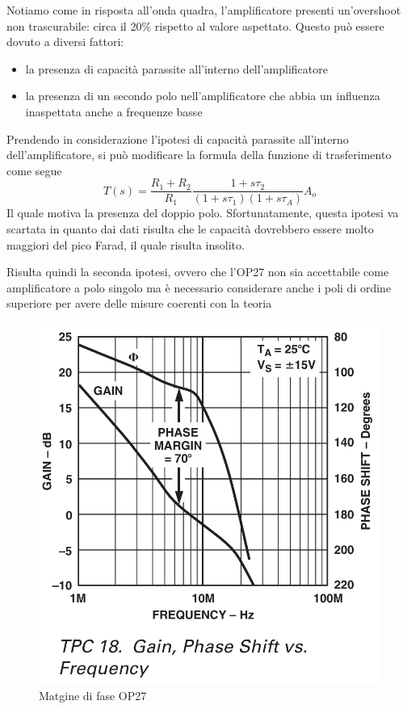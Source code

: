 

\begin{flushleft}

\colorbox{notebox}{
\begin{minipage}[]{\textwidth}

    Notiamo come in risposta all'onda quadra, l'amplificatore presenti un'overshoot non trascurabile: circa il 20\% rispetto al valore aspettato.
Questo può essere dovuto a diversi fattori:
\begin{itemize}
    \item la presenza di capacità parassite all'interno dell'amplificatore
    \item la presenza di un secondo polo nell'amplificatore che abbia un influenza inaspettata anche a frequenze basse
\end{itemize}
Prendendo in considerazione l'ipotesi di capacità parassite all'interno dell'amplificatore, si può modificare la formula della funzione di trasferimento come segue
\begin{equation}
    T(s) = \frac{R_1+R_2}{R_1} \frac{1+s\tau_2}{(1+s\tau_1)(1+s\tau_A)} A_o
\end{equation}
Il quale motiva la presenza del doppio polo. Sfortunatamente, questa ipotesi va scartata in quanto dai dati risulta che le capacità dovrebbero essere molto maggiori del pico Farad, il quale risulta insolito.

Risulta quindi la seconda ipotesi, ovvero che l'OP27 non sia accettabile come amplificatore a polo singolo ma è necessario considerare anche i poli di ordine superiore per avere delle misure coerenti con la teoria
\end{minipage}
}
\end{flushleft}





\begin{figure}[!h]
    \centering
    \includegraphics[width=0.3\linewidth]{assets/OP27/OP27_Phase_Margin.png}
    \caption{Matgine di fase OP27}
\end{figure}

